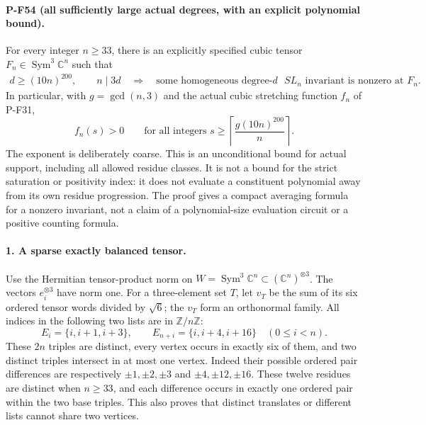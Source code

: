 \documentclass[11pt,a4paper]{article}
\begin{document}
\paragraph{P-F54 (all sufficiently large actual degrees, with an explicit polynomial bound).}
For every integer $n\ge33$, there is an explicitly specified
cubic tensor $F_n\in\operatorname{Sym}^3\mathbb C^n$ such that
\[
 \begin{gathered}
 d\ge(10n)^{200},\qquad n\mid3d
 \quad\Longrightarrow\quad
 \text{some homogeneous degree-$d$ $SL_n$ invariant is nonzero at }F_n.
 \end{gathered}                                                   \tag{P-F54a}
\]
In particular, with $g=\gcd(n,3)$ and the actual cubic stretching
function $f_n$ of P-F31,
\[
 f_n(s)>0\qquad\text{for all integers }s\ge
             \left\lceil\frac{g(10n)^{200}}n\right\rceil .        \tag{P-F54b}
\]
The exponent is deliberately coarse. This is an unconditional
bound for actual support, including all allowed residue classes.
It is not a bound for the strict saturation or positivity index:
it does not evaluate a constituent polynomial away from its own
residue progression. The proof gives a compact averaging formula
for a nonzero invariant, not a claim of a polynomial-size
evaluation circuit or a positive counting formula.

\paragraph{1. A sparse exactly balanced tensor.}
Use the Hermitian tensor-product norm on
$W=\operatorname{Sym}^3\mathbb C^n\subset(\mathbb C^n)^{\otimes3}$.
The vectors $e_i^{\otimes3}$ have norm one. For a three-element
set $T$, let $v_T$ be the sum of its six ordered tensor words
divided by $\sqrt6$; the $v_T$ form an orthonormal family.
All indices in the following two lists are in $\mathbb Z/n\mathbb Z$:
\[
 E_i=\{i,i+1,i+3\},\qquad E_{n+i}=\{i,i+4,i+16\}
                      \quad(0\le i<n).                         \tag{P-F54c}
\]
These $2n$ triples are distinct, every vertex occurs in exactly six
of them, and two distinct triples intersect in at most one vertex.
Indeed their possible ordered pair differences are respectively
$\pm1,\pm2,\pm3$ and $\pm4,\pm12,\pm16$. These twelve
residues are distinct when $n\ge33$, and each difference occurs
in exactly one ordered pair within the two base triples. This
also proves that distinct translates or different lists cannot
share two vertices.
\end{document}
